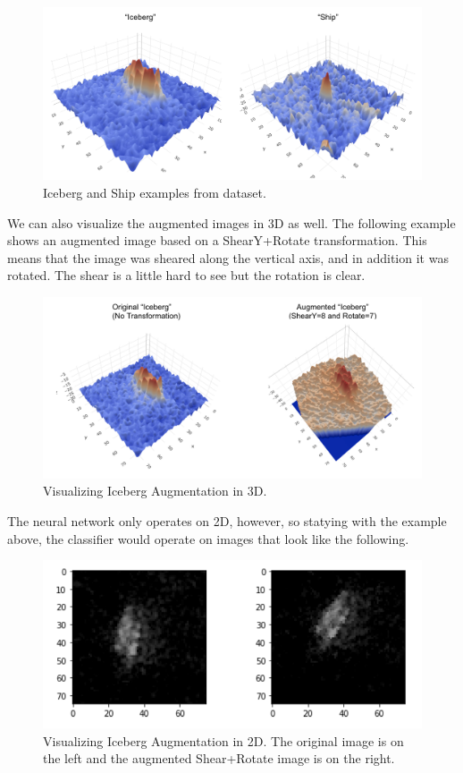 \documentclass[10pt,twocolumn,letterpaper]{article}
\begin{document}
\begin{figure}[bhp]
\includegraphics[width=\columnwidth]{iceberg_ship_example.png}
\caption{Iceberg and Ship examples from dataset.}
\end{figure}

We can also visualize the augmented images in 3D as well.  The following example shows an augmented image based on a ShearY+Rotate transformation.  This means that the image was sheared along the vertical axis, and in addition it was rotated.  The shear is a little hard to see but the rotation is clear.

\begin{figure}[bhp]
\includegraphics[width=\columnwidth]{iceberg_aug_example.png}
\caption{Visualizing Iceberg Augmentation in 3D.}
\end{figure}

The neural network only operates on 2D, however, so statying with the example above, the classifier would operate on images that look like the following.

\begin{figure}[bhp]
\includegraphics[width=\columnwidth]{iceberg_aug_2d_example.png}
\caption{Visualizing Iceberg Augmentation in 2D.  The original image is on the left and the augmented Shear+Rotate image is on the right.}
\end{figure}
\end{document}
